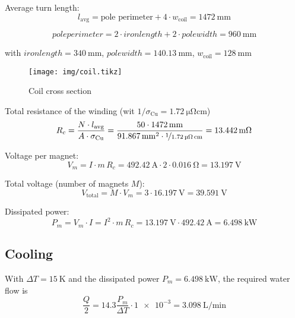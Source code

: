 \documentclass[10pt,a4paper,noendnumber=true]{scrartcl}
\begin{document}
Average turn length:
\begin{equation}
    l_\text{avg}= \text{pole perimeter} + 4 \cdot w_\text{coil} = \SI{1472}{\mm}
\end{equation}

\begin{equation}
pole perimeter = 2 \cdot iron length + 2 \cdot pole width = \SI{960}{\mm}
\end{equation}

with $iron length = \SI{340}{\mm}$, $pole width = \SI{140.13}{\mm}$, $w_\text{coil} = \SI{128}{\mm}$

\begin{figure}[H]
\centering
\texttt{[image: img/coil.tikz]}
\caption{Coil cross section}
\end{figure}

Total resistance of the winding (wit $1/\sigma_\text{Cu}=\SI{1.72}{\micro\ohm\cm}$)
\begin{equation}
R_c=\frac{N\cdot l_\text{avg}}{A\cdot\sigma_\text{Cu}} = \frac{50 \cdot \SI{1472}{\mm}}{\SI{91.867}{\mm\squared}\cdot \nicefrac{1}{\SI{1.72}{\micro\ohm\cm}}} = \SI{13.442}{\milli\ohm}
\end{equation}

Voltage per magnet:
\begin{equation}
V_m = I \cdot m\,R_c = \SI{492.42}{\ampere} \cdot 2 \cdot \SI{0.016}{\ohm} = \SI{13.197}{\volt}
\end{equation}

Total voltage (number of magnets $M$):
\begin{equation}
V_\text{total} = M \cdot V_m = 3 \cdot \SI{16.197}{\volt} = \SI{39.591}{\volt}
\end{equation}

Dissipated power:
\begin{equation}
P_m = V_m \cdot I = I^2 \cdot m\,R_c = \SI{13.197}{\volt} \cdot \SI{492.42}{\ampere} = \SI{6.498}{\kilo\watt}
\end{equation}

\subsection{Cooling}
With $\Delta T=\SI{15}{\kelvin}$ and the dissipated power $P_m=\SI{6.498}{\kilo\watt}$, the required water flow is
\begin{equation}
    \frac{Q}{2} = 14.3 \frac{P_m}{\Delta T} \cdot \num{1e-3} = \SI{3.098}{\liter\per\minute}
\end{equation}
\end{document}
